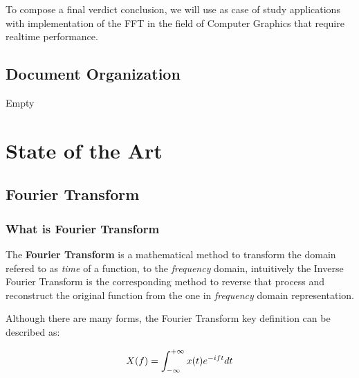 \documentclass[
  oneside,
  11pt, a4paper,
  footinclude=true,
  headinclude=true,
  cleardoublepage=empty
]{scrbook}
\newcommand{\eqname}[1]{\tag*{#1}}%
\begin{document}
To compose a final verdict conclusion, we will use as case of study applications with implementation of the FFT in the field of Computer Graphics that require realtime performance.

\section{Document Organization} \label{sec:document-organization}

Empty


\chapter{State of the Art} \label{chap:state-of-the-art}

\section{Fourier Transform} \label{sec:fourier-transform}

\subsection{What is Fourier Transform} \label{subsec:what-is-fourier-transform}

The \textbf{Fourier Transform} is a mathematical method to transform the domain refered to as \textit{time} of a function, to the \textit{frequency} domain, intuitively the Inverse Fourier Transform is the corresponding method to reverse that process and reconstruct the original function from the one in \textit{frequency} domain representation.

Although there are many forms, the Fourier Transform key definition can be described as:

\begin{equation} \label{eq1}
    X(f) = \int_{-\infty}^{+\infty} x(t)e^{-i f t} dt \\ %
\end{equation}
\end{document}
